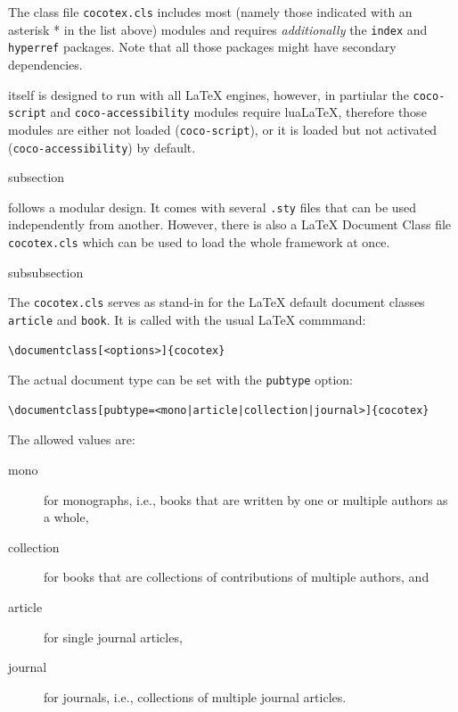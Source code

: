 The {\CoCoTeX} class file \texttt{cocotex.cls} includes most (namely
those indicated with an asterisk * in the list above) {\CoCoTeX} modules
and requires \textit{additionally} the \texttt{index} and
\texttt{hyperref} packages. Note that all those packages might have
secondary dependencies.

{\CoCoTeX} itself is designed to run with all {\LaTeX} engines,
however, in partiular the \texttt{coco-script} and
\texttt{coco-accessibility} modules require {lua\LaTeX}, therefore
those modules are either not loaded (\texttt{coco-script}), or it is
loaded but not activated (\texttt{coco-accessibility}) by default.


\begin{Heading}{subsection}
\end{Heading}

{\CoCoTeX} follows a modular design. It comes with several
\lstinline{.sty} files that can be used independently from
another. However, there is also a {\LaTeX} Document Class file
\lstinline{cocotex.cls} which can be used to load the whole framework
at once.

\begin{Heading}{subsubsection}
\end{Heading}

The \lstinline{cocotex.cls} serves as stand-in for the {\LaTeX}
default document classes \lstinline{article} and \lstinline{book}. It
is called with the usual {\LaTeX} commmand:
\begin{lstlisting}[style=tex]
\documentclass[<options>]{cocotex}
\end{lstlisting}

The actual document type can be set with the \lstinline{pubtype} option:
\begin{lstlisting}[style=tex]
\documentclass[pubtype=<mono|article|collection|journal>]{cocotex}
\end{lstlisting}
The allowed values are:
\begin{description}
\item[\ttfamily mono] for monographs, i.e., books that are written by one or
  multiple authors as a whole,
\item[\ttfamily collection] for books that are collections of contributions of
  multiple authors, and
\item[\ttfamily article] for single journal articles,
\item[\ttfamily journal] for journals, i.e., collections of multiple journal
  articles.
\end{description}


